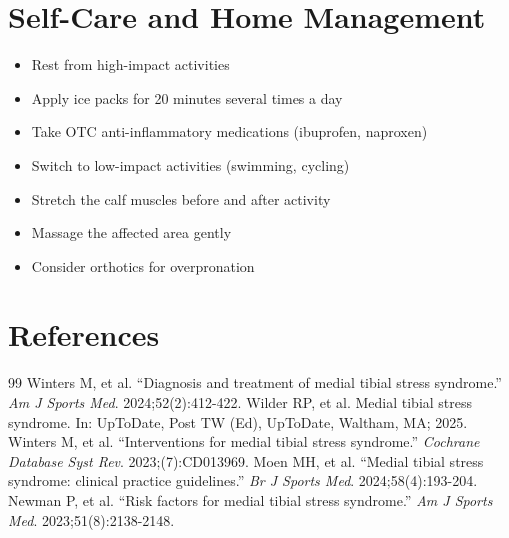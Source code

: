 \section*{Self-Care and Home Management}
\begin{itemize}
\item Rest from high-impact activities
\item Apply ice packs for 20 minutes several times a day
\item Take OTC anti-inflammatory medications (ibuprofen, naproxen)
\item Switch to low-impact activities (swimming, cycling)
\item Stretch the calf muscles before and after activity
\item Massage the affected area gently
\item Consider orthotics for overpronation
\end{itemize}

\section*{References}
\begin{thebibliography}{99}
 Winters M, et al. ``Diagnosis and treatment of medial tibial stress syndrome.'' \emph{Am J Sports Med}. 2024;52(2):412-422.
 Wilder RP, et al. Medial tibial stress syndrome. In: UpToDate, Post TW (Ed), UpToDate, Waltham, MA; 2025.
 Winters M, et al. ``Interventions for medial tibial stress syndrome.'' \emph{Cochrane Database Syst Rev}. 2023;(7):CD013969.
 Moen MH, et al. ``Medial tibial stress syndrome: clinical practice guidelines.'' \emph{Br J Sports Med}. 2024;58(4):193-204.
 Newman P, et al. ``Risk factors for medial tibial stress syndrome.'' \emph{Am J Sports Med}. 2023;51(8):2138-2148.
\end{thebibliography}
